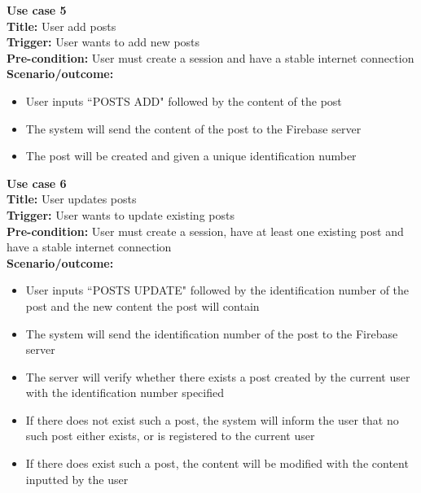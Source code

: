 \documentclass[12pt, titlepage]{article}
\begin{document}
\textbf{Use case 5}\\
\textbf{Title:} User add posts\\
\textbf{Trigger:} User wants to add new posts\\
\textbf{Pre-condition:} User must create a session and have a stable internet connection\\
\textbf{Scenario/outcome:}
    \begin{itemize}
        \item User inputs ``POSTS ADD" followed by the content of the post
        \item The system will send the content of the post to the Firebase server
        \item The post will be created and given a unique identification number 
    \end{itemize}
    
    
\textbf{Use case 6}\\
\textbf{Title:} User updates posts\\
\textbf{Trigger:} User wants to update existing posts\\
\textbf{Pre-condition:} User must create a session, have at least one existing post and have a stable internet connection\\
\textbf{Scenario/outcome:}
    \begin{itemize}
        \item User inputs ``POSTS UPDATE" followed by the identification number of the post and the new content the post will contain
        \item The system will send the identification number of the post to the Firebase server
        \item The server will verify whether there exists a post created by the current user with the identification number specified
        \item If there does not exist such a post, the system will inform the user that no such post either exists, or is registered to the current user
        \item If there does exist such a post, the content will be modified with the content inputted by the user
    \end{itemize}
    
\end{document}
